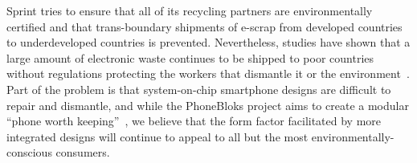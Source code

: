 Sprint tries to ensure that all of its recycling partners are environmentally
certified and that trans-boundary shipments of e-scrap from developed
countries to underdeveloped countries is prevented. Nevertheless, studies
have shown that a large amount of electronic waste continues to be shipped to
poor countries without regulations protecting the workers that dismantle it
or the environment~\cite{etbc-dumping}. Part of the problem is that
system-on-chip smartphone designs are difficult to repair and dismantle, and
while the PhoneBloks project aims to create a modular ``phone worth
keeping''~\cite{phonebloks-url}, we believe that the form factor facilitated
by more integrated designs will continue to appeal to all but the most
environmentally-conscious consumers.
